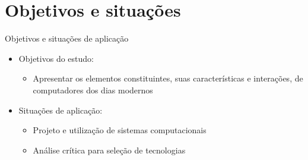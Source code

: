 \section[ slide = true]{Objetivos e situações}
\begin{slide}[toc=]{Objetivos e situações de aplicação}
\begin{itemize}
  \item Objetivos do estudo:
  \begin{itemize}
    \item Apresentar os elementos constituintes, suas características e interações, de computadores dos dias modernos
  \end{itemize}
  \item Situações de aplicação:
  \begin{itemize}
    \item Projeto e utilização de sistemas computacionais
    \item Análise crítica para seleção de tecnologias
  \end{itemize}
\end{itemize}
\end{slide}

